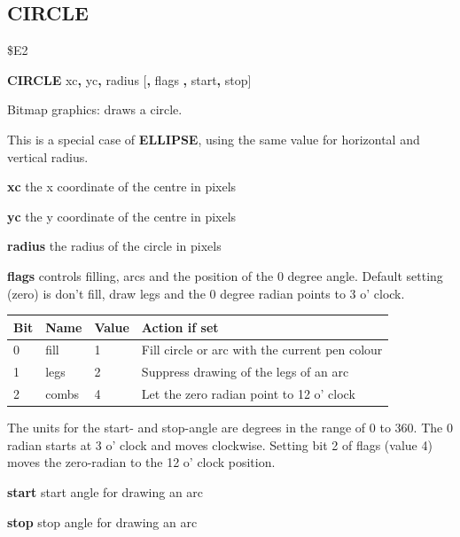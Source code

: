 \subsection{CIRCLE}
\begin{description}[leftmargin=2cm,style=nextline]
\item [Token:] \$E2
\item [Format:] {\bf CIRCLE} xc{\bf,} yc{\bf,} radius [{\bf,} flags
                {\bf,} start{\bf,} stop]
\item [Usage:] Bitmap graphics: draws a circle.

               This is a special case of
               {\bf ELLIPSE}, using the same value for
               horizontal and vertical radius.

               {\bf xc} the x coordinate of the centre in pixels

               {\bf yc} the y coordinate of the centre in pixels

               {\bf radius} the radius of the circle in pixels

               {\bf flags} controls filling, arcs and
                           the position of the 0 degree angle.
               Default setting (zero) is don't fill, draw legs
               and the 0 degree radian points to 3 o' clock.

{\setlength{\tabcolsep}{1.5mm}
\begin{tabular}{|l|l|l|l|}
\hline
{\bf Bit}  & {\bf Name} & {\bf Value} & {\bf Action if set} \\
\hline
  0 & fill  & 1  & Fill circle or arc with the current pen colour \\
  1 & legs  & 2  & Suppress drawing of the legs of an arc \\
  2 & combs & 4  & Let the zero radian point to 12 o' clock \\
\hline
\end{tabular}
}

               The units for the start- and stop-angle are degrees
               in the range of 0 to 360. The 0 radian starts
               at 3 o' clock and moves clockwise.
               Setting bit 2 of flags (value 4) moves the zero-radian
               to the 12 o' clock position.

               {\bf start} start angle for drawing an arc

               {\bf stop} stop angle for drawing an arc




\end{description}
